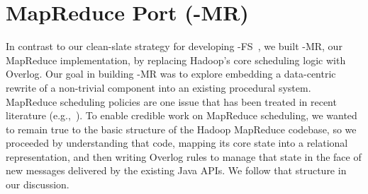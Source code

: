 
\section{MapReduce Port (\BOOM-MR)}
\label{ch:boom:sec:port}

In contrast to our clean-slate strategy for developing \BOOM-FS~\cite{boom}, we built
\BOOM-MR, our MapReduce implementation, by replacing Hadoop's core scheduling
logic with Overlog. Our goal in building \BOOM-MR was to explore embedding a
data-centric rewrite of a non-trivial component into an existing procedural
system.  MapReduce scheduling policies are one issue that has been treated in
recent literature (e.g.,~\cite{late-sched,delay-sched}).  To enable credible
work on MapReduce scheduling, we wanted to remain true to the basic structure of
the Hadoop MapReduce codebase, so we proceeded by understanding that code,
mapping its core state into a relational representation, and then writing
Overlog rules to manage that state in the face of new messages delivered by the
existing Java APIs.  We follow that structure in our discussion.



